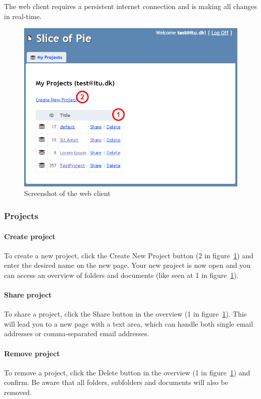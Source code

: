 The web client requires a persistent internet connection and is making all changes in real-time.

\begin{figure}[htb]
	\centering
	\includegraphics[width=1\textwidth]{User_manual/graphics/web.png}
	\caption{Screenshot of the web client}
	\label{fig:manual-web}
\end{figure}

\subsubsection{Projects}

	\paragraph{Create project}
	To create a new project, click the Create New Project button (2 in figure~\ref{fig:manual-web}) and enter the desired name on the new page. Your new project is now open and you can access an overview of folders and documents (like seen at 1 in figure~\ref{fig:manual-web}).

	\paragraph{Share project}
	To share a project, click the Share button in the overview (1 in figure~\ref{fig:manual-web}). This will lead you to a new page with a text area, which can handle both single email addresses or comma-separated email addresses.
	
	\paragraph{Remove project}
	To remove a project, click the Delete button in the overview (1 in figure~\ref{fig:manual-web}) and confirm. Be aware that all folders, subfolders and documents will also be removed.


